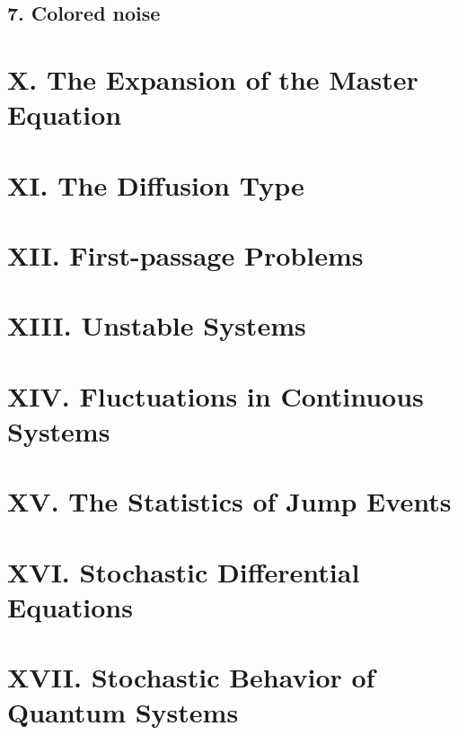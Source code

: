 \documentclass{book}
\begin{document}
\section{7. Colored noise}

\chapter{X. The Expansion of the Master Equation}

\chapter{XI. The Diffusion Type}

\chapter{XII. First-passage Problems}

\chapter{XIII. Unstable Systems}

\chapter{XIV. Fluctuations in Continuous Systems}

\chapter{XV. The Statistics of Jump Events}

\chapter{XVI. Stochastic Differential Equations}

\chapter{XVII. Stochastic Behavior of Quantum Systems}
\end{document}
